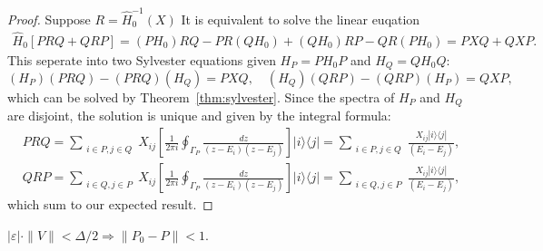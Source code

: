 \begin{proof}
Suppose $R = \hat{H}_0^{-1}(X)$
It is equivalent to solve the linear euqation
\begin{align}
    \hat{H}_0\left[PRQ + Q R P\right] = (PH_0)RQ - PR(QH_0) + (QH_0)RP - QR(PH_0) =PXQ + QXP.
\end{align}
This seperate into two Sylvester equations given $H_P = P H_0 P$ and $H_Q = Q H_0 Q$:
$$
(H_P) (P R Q) - (P R Q) (H_Q) = PXQ, \quad (H_Q)(QR P) - (QR P)(H_P) = QXP,
$$
which can be solved by Theorem~\ref{thm:sylvester}.
Since the spectra of $H_P$ and $H_Q$ are disjoint, the solution is unique and given by the integral formula:
\begin{align}
&PRQ = \sum_{\substack{i\in P, j\in Q}} X_{ij}
\left[\frac{1}{2\pi i}\oint_{\Gamma_P}\frac{dz}{(z-E_i)(z-E_j)}\right] |i\rangle\langle j|
=\sum_{\substack{i\in P, j\in Q}} \frac{X_{ij} |i\rangle\langle j|}{(E_i-E_j)},\\
&QRP = \sum_{\substack{i\in Q, j\in P}} X_{ij}
\left[\frac{1}{2\pi i}\oint_{\Gamma_P}\frac{dz}{(z-E_i)(z-E_j)}\right] |i\rangle\langle j|
=\sum_{\substack{i\in Q, j\in P}} \frac{X_{ij} |i\rangle\langle j|}{(E_i-E_j)},
\end{align}
which sum to our expected result.
\end{proof}



\begin{lemma}\label{lem:subspace-proximity}
$|\varepsilon|\cdot \|V\| < \Delta/2 \Rightarrow \|P_0 - P\| <1$.
\end{lemma}

